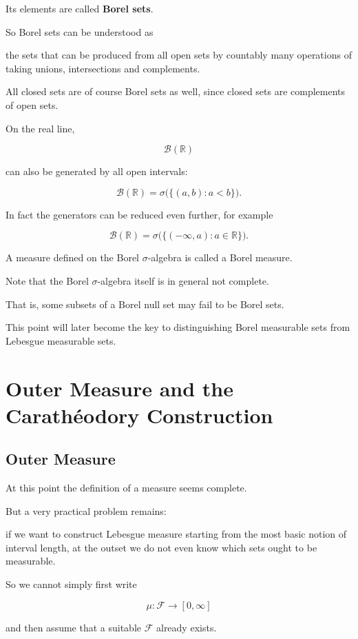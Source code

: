\documentclass[11pt]{article}
\begin{document}
Its elements are called \textbf{Borel sets}.

So Borel sets can be understood as

the sets that can be produced from all open sets by countably many operations of taking unions, intersections and complements.

All closed sets are of course Borel sets as well, since closed sets are complements of open sets.

On the real line,

\[
\mathcal{B}(\mathbb{R})
\]

can also be generated by all open intervals:

\[
\mathcal{B}(\mathbb{R})=\sigma\big(\{(a,b):a<b\}\big).
\]

In fact the generators can be reduced even further, for example

\[
\mathcal{B}(\mathbb{R})=\sigma\big(\{(-\infty,a):a\in\mathbb{R}\}\big).
\]

A measure defined on the Borel $\sigma$-algebra is called a Borel measure.

Note that the Borel $\sigma$-algebra itself is in general not complete.

That is, some subsets of a Borel null set may fail to be Borel sets.

This point will later become the key to distinguishing Borel measurable sets from Lebesgue measurable sets.

\section{Outer Measure and the Carathéodory Construction}

\subsection{Outer Measure}

At this point the definition of a measure seems complete.

But a very practical problem remains:

if we want to construct Lebesgue measure starting from the most basic notion of interval length, at the outset we do not even know which sets ought to be measurable.

So we cannot simply first write

\[
\mu:\mathcal{F}\rightarrow[0,\infty]
\]

and then assume that a suitable $\mathcal{F}$ already exists.
\end{document}
